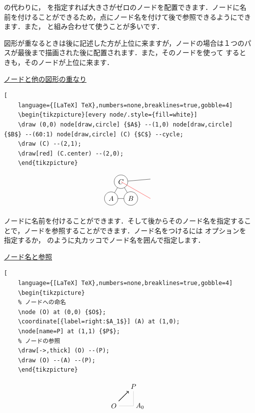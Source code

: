 \documentclass[../geometrymemo.tex]{subfiles}
\begin{document}
 の代わりに， を指定すれば大きさがゼロのノードを配置できます．ノードに名前を付けることができるため，点にノード名を付けて後で参照できるようにできます．また， と組み合わせて使うことが多いです．

図形が重なるときは後に記述した方が上位に来ますが，ノードの場合は１つのパスが最後まで描画された後に配置されます．また，そのノードを使って \lstinlineiv{\draw} するときも，そのノードが上位に来ます．

\underline{ノードと他の図形の重なり}
\begin{lstlisting}[
    language={[LaTeX] TeX},numbers=none,breaklines=true,gobble=4]
    \begin{tikzpicture}[every node/.style={fill=white}]
    \draw (0,0) node[draw,circle] {$A$} --(1,0) node[draw,circle] {$B$} --(60:1) node[draw,circle] (C) {$C$} --cycle;
    \draw (C) --(2,1);
    \draw[red] (C.center) --(2,0);
    \end{tikzpicture}
\end{lstlisting}
\[
    \begin{tikzpicture}[every node/.style={fill=white}]
    \draw (0,0) node[draw,circle] {$A$} --(1,0) node[draw,circle] {$B$} --(60:1) node[draw,circle] (C) {$C$} --cycle;
    \draw (C) --(2,1);
    \draw[red] (C.center) --(2,0);
    \end{tikzpicture}
\]

ノードに名前を付けることができます．そして後からそのノード名を指定することで，ノードを参照することができます．ノード名をつけるには  オプションを指定するか， のように丸カッコでノード名を囲んで指定します．

\underline{ノード名と参照}
\begin{lstlisting}[
    language={[LaTeX] TeX},numbers=none,breaklines=true,gobble=4]
    \begin{tikzpicture}
    % ノードへの命名
    \node (O) at (0,0) {$O$};
    \coordinate[{label=right:$A_1$}] (A) at (1,0);
    \node[name=P] at (1,1) {$P$};
    % ノードの参照
    \draw[->,thick] (O) --(P);
    \draw (O) --(A) --(P);
    \end{tikzpicture}
\end{lstlisting}
\[
    \begin{tikzpicture}
    \node (O) at (0,0) {$O$};
    \coordinate[{label=right:$A_0$}] (A) at (1,0);
    \node[name=P] at (1,1) {$P$};
    \draw[->,thick] (O) --(P);
    \draw[help lines] (O) --(A) --(P);
    \end{tikzpicture}
\]
\end{document}
